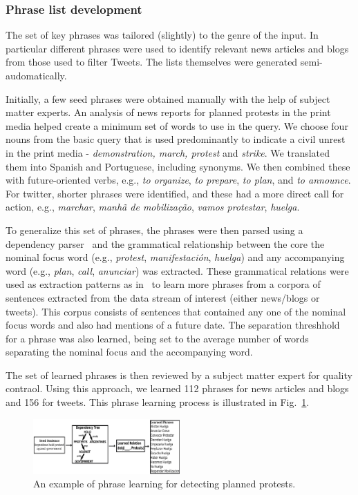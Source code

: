 \subsubsection{Phrase list development}
\label{sec:phraselearning}
The set of key phrases was tailored (slightly) to the genre of the
input. In particular different phrases were used to identify relevant
news articles and blogs from those used to filter Tweets.  The lists
themselves were generated semi-audomatically.

Initially, a few seed phrases were obtained manually
with the help of subject matter experts.
An analysis of news reports for planned protests in the print media helped create a
minimum set of words to use in the query.  We choose four nouns from
the basic query that is used predominantly to indicate a civil unrest
in the print media - {\em demonstration, march, protest} and
{\it strike}. We translated them into Spanish and Portuguese, including
synonyms.  We then combined these with future-oriented verbs, e.g., {\em to organize}, {\em to prepare}, {\em to
plan}, and {\em to announce}. For twitter, shorter phrases were identified, and these had
a more direct call for action, e.g., {\em marchar}, {\em manhã de mobilização}, {\em
  vamos protestar}, {\em huelga}.

To generalize this set of phrases, the phrases were then parsed
using a dependency parser~\cite{freeling} and the grammatical
relationship between the core the nominal focus word (e.g., {\em protest}, 
{\em manifestación}, {\em huelga}) and any accompanying
word (e.g., {\em plan}, {\em call}, {\em anunciar}) was
extracted. These grammatical relations were used as extraction
patterns as in~\cite{riloff2003learning} to learn more phrases from a
corpora of sentences extracted from the data stream of interest
(either news/blogs or tweets). This corpus consists of sentences that
contained any one of the nominal focus words and also had mentions of
a future date. The separation threshhold for a phrase was also
learned, being set to the average number of words separating
the nominal focus and the accompanying word.

The set of learned phrases is then reviewed by a subject matter expert for quality contraol.  
Using this approach, we learned 112 phrases for news articles and blogs and 156 for tweets.  
This phrase learning process is illustrated in Fig.~\ref{fig:phraselearning}.

\begin{figure}
\includegraphics[width=0.5\textwidth]{figures/phraseLearning}
\caption{An example of phrase learning for detecting planned protests.}
\label{fig:phraselearning}
\end{figure}

